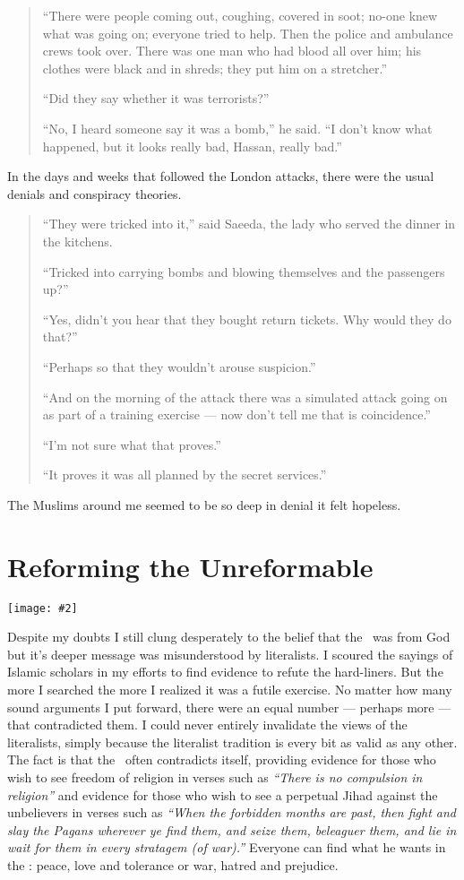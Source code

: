 \documentclass[12pt]{memoir}
\newcommand{\img}[3]{\begin{center}%
\texttt{[image: \#2]}\\{\small\em#3}%
\end{center}}
\begin{document}
\begin{quote}
“There were people coming out, coughing, covered in soot;
no-one knew what was going on; everyone tried to help.
Then the police and ambulance crews took over.
There was one man who had blood all over him;
his clothes were black and in shreds; they put him on a stretcher.”

“Did they say whether it was terrorists?”

“No, I heard someone say it was a bomb,” he said.
“I don’t know what happened, but it looks really bad, Hassan, really bad.”
\end{quote}

In the days and weeks that followed the London attacks,
there were the usual denials and conspiracy theories.

\begin{quote}
“They were tricked into it,” said Saeeda,
the lady who served the dinner in the kitchens.

“Tricked into carrying bombs and blowing themselves and the passengers up?”

“Yes, didn’t you hear that they bought return tickets.
Why would they do that?”

“Perhaps so that they wouldn’t arouse suspicion.”

“And on the morning of the attack there was a simulated attack going on
as part of a training exercise — now don’t tell me that is coincidence.”

“I’m not sure what that proves.”

“It proves it was all planned by the secret services.”
\end{quote}

The Muslims around me seemed to be so deep in denial it felt hopeless.


\chapter{Reforming the Unreformable}

\img{scale=0.4}{Quranic_Script.jpg}{}

Despite my doubts I still clung desperately to the belief
that the \Quran\ was from God but it’s deeper message
was misunderstood by literalists.
I scoured the sayings of Islamic scholars in my efforts
to find evidence to refute the hard-liners.
But the more I searched the more I realized it was a futile exercise.
No matter how many sound arguments I put forward,
there were an equal number — perhaps more — that contradicted them.
I could never entirely invalidate the views of the literalists,
simply because the literalist tradition is every bit as valid as any other.
The fact is that the \Quran\ often contradicts itself,
providing evidence for those who wish to see freedom of religion
in verses such as \emph{“There is no compulsion in religion”}
and evidence for those who wish to see a perpetual Jihad against
the unbelievers in verses such as
\emph{“When the forbidden months are past, then fight and slay the Pagans
wherever ye find them, and seize them, beleaguer them,
and lie in wait for them in every stratagem (of war).”}
Everyone can find what he wants in the \Quran:
peace, love and tolerance or war, hatred and prejudice.
\end{document}

